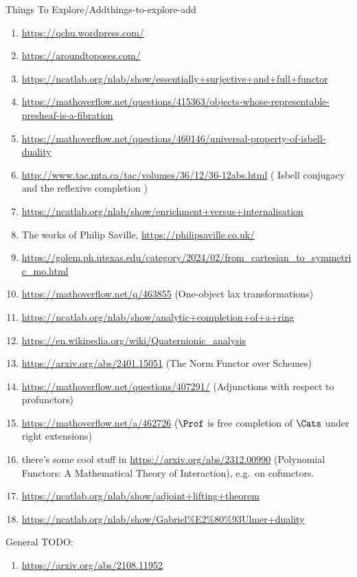 \begin{remark}{Things To Explore/Add}{things-to-explore-add}
\begin{enumerate}
        \item \url{https://qchu.wordpress.com/}
        \item \url{https://aroundtoposes.com/}
        \item \url{https://ncatlab.org/nlab/show/essentially+surjective+and+full+functor}
        \item \url{https://mathoverflow.net/questions/415363/objects-whose-representable-presheaf-is-a-fibration}
        \item \url{https://mathoverflow.net/questions/460146/universal-property-of-isbell-duality}
        \item \url{http://www.tac.mta.ca/tac/volumes/36/12/36-12abs.html} ( Isbell conjugacy and the reflexive completion )
        \item \url{https://ncatlab.org/nlab/show/enrichment+versus+internalisation}
        \item The works of Philip Saville, \url{https://philipsaville.co.uk/}
        \item \url{https://golem.ph.utexas.edu/category/2024/02/from\_cartesian\_to\_symmetric\_mo.html}
        \item \url{https://mathoverflow.net/q/463855} (One-object lax transformations)
        \item \url{https://ncatlab.org/nlab/show/analytic+completion+of+a+ring}
        \item \url{https://en.wikipedia.org/wiki/Quaternionic\_analysis}
        \item \url{https://arxiv.org/abs/2401.15051} (The Norm Functor over Schemes)
        \item \url{https://mathoverflow.net/questions/407291/} (Adjunctions with respect to profunctors)
        \item \url{https://mathoverflow.net/a/462726} ($\Prof$ is free completion of $\Cats$ under right extensions)
        \item there's some cool stuff in \url{https://arxiv.org/abs/2312.00990} (Polynomial Functors: A Mathematical Theory of Interaction), e.g.\ on cofunctors.
        \item \url{https://ncatlab.org/nlab/show/adjoint+lifting+theorem}
        \item \url{https://ncatlab.org/nlab/show/Gabriel\%E2\%80\%93Ulmer+duality}
    \end{enumerate}
    General TODO:
    \begin{enumerate}
        \item \url{https://arxiv.org/abs/2108.11952}

\end{enumerate}
\end{remark}
